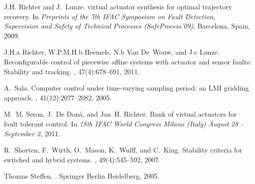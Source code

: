 \documentclass[letterpaper, 10 pt, conference]{ieeeconf}
\begin{document}
\begin{thebibliography}{10}
J.H. Richter and J.~Lunze.
 virtual actuator synthesis for optimal trajectory
  recovery.
\newblock In {\em Preprints of the 7th IFAC Symposium on Fault Detection,
  Supervision and Safety of Technical Processes (SafeProcess'09)}, Barcelona,
  Spain, 2009.

J.H.a Richter, W.P.M.H.b Heemels, N.b Van De~Wouw, and J.c Lunze.
\newblock Reconfigurable control of piecewise affine systems with actuator and
  sensor faults: Stability and tracking.
, 47(4):678--691, 2011.

A.~Sala.
\newblock Computer control under time-varying sampling period: an {LMI}
  gridding approach.
, 41(12):2077--2082, 2005.

M.~M. Seron, J.~{De Don\'a}, and Jan~H. Richter.
\newblock Bank of virtual actuators for fault tolerant control.
\newblock In {\em 18th IFAC World Congress Milano (Italy) August 28 - September
  2}, 2011.

R.~Shorten, F.~Wirth, O.~Mason, K.~Wulff, and C.~King.
\newblock Stability criteria for switched and hybrid systems.
, 49(4):545--592, 2007.

Thomas Steffen.
.
\newblock Springer Berlin Heidelberg, 2005.

\end{thebibliography}
\end{document}
